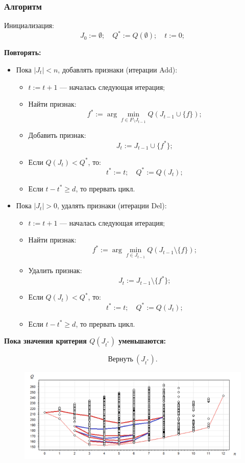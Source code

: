\subsubsection*{Алгоритм}


Инициализация:
\[
J_0 := \emptyset; \quad Q^* := Q(\emptyset); \quad t := 0;
\]

\textbf{Повторять:}
\begin{itemize}
    \item Пока \( |J_t| < n \), добавлять признаки (итерации Add):
    \begin{itemize}
        \item \( t := t + 1 \) — началась следующая итерация;
        \item Найти признак:
        \[
        f^* := \arg \min_{f \in F \setminus J_{t-1}} Q(J_{t-1} \cup \{f\});
        \]
        \item Добавить признак:
        \[
        J_t := J_{t-1} \cup \{f^*\};
        \]
        \item Если \( Q(J_t) < Q^* \), то:
        \[
        t^* := t; \quad Q^* := Q(J_t);
        \]
        \item Если \( t - t^* \geq d \), то прервать цикл.
    \end{itemize}
    \item Пока \( |J_t| > 0 \), удалять признаки (итерации Del):
    \begin{itemize}
        \item \( t := t + 1 \) — началась следующая итерация;
        \item Найти признак:
        \[
        f^* := \arg \min_{f \in J_{t-1}} Q(J_{t-1} \setminus \{f\});
        \]
        \item Удалить признак:
        \[
        J_t := J_{t-1} \setminus \{f^*\};
        \]
        \item Если \( Q(J_t) < Q^* \), то:
        \[
        t^* := t; \quad Q^* := Q(J_t);
        \]
        \item Если \( t - t^* \geq d \), то прервать цикл.
    \end{itemize}
\end{itemize}

\textbf{Пока значения критерия \( Q(J_{t^*}) \) уменьшаются:}

\[ \text{Вернуть} \ ( J_{t^*} ).\]


\begin{figure}[h!!!!!!!!!!]
	\centering
	\includegraphics[width=1\linewidth]{add-del.png}
\end{figure}



